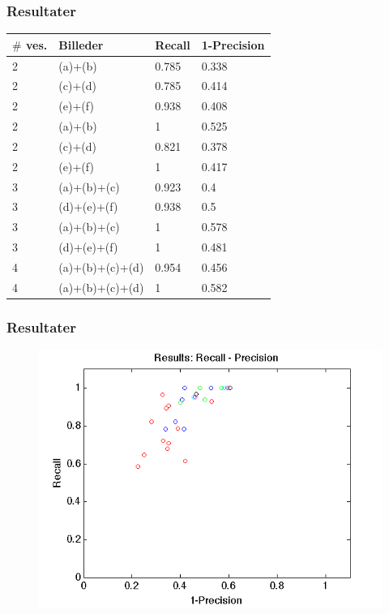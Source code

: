 \documentclass[12pt,t]{beamer}
\begin{document}
\begin{frame}
\frametitle{Resultater}

\begin{table}[H]
	\begin{tabular}{l|l|l|l}
		$\#$ ves. & Billeder & Recall & 1-Precision \\\hline
		2	&	(a)+(b)	 							&0.785 	&0.338\\\hline
		2	&	(c)+(d)	 							&0.785 	&0.414\\\hline
		2	&	(e)+(f)								&0.938 	&0.408\\\hline
		2	&	(a)+(b)  					&1 		&0.525\\\hline
		2	&	(c)+(d)  					&0.821 	&0.378\\\hline
		2	&	(e)+(f)  					&1 		&0.417\\\hline
		3	&	(a)+(b)+(c)	 						&0.923 	&0.4\\\hline
		3	&	(d)+(e)+(f)	 						&0.938 	&0.5\\\hline
		3	&	(a)+(b)+(c)				&1 		&0.578\\\hline
		3	&	(d)+(e)+(f)				&1 		&0.481\\\hline
		4	&	(a)+(b)+(c)+(d)						&0.954 	&0.456\\\hline
		4	&	(a)+(b)+(c)+(d)  			&1 		&0.582\\
	\end{tabular}
\end{table}
\end{frame}

\begin{frame}
\frametitle{Resultater}
\begin{figure}[H]
	\centering
	\includegraphics[scale=0.6]{../files/postmethod/img/recallvsprecision2.png}
\end{figure}
\end{frame}
\end{document}
